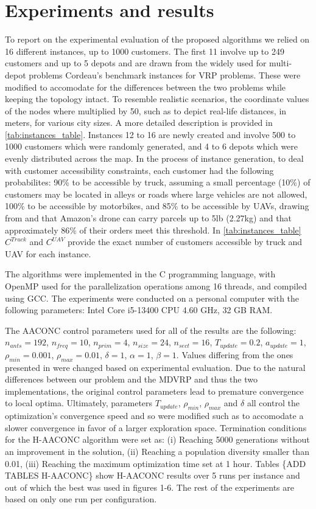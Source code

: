 \documentclass{article}
\begin{document}
	\section{Experiments and results}
	To report on the experimental evaluation of the proposed algorithms we relied on 16 different instances, up to 1000 customers. The first 11 involve up to 249 customers and up to 5 depots and are drawn from the widely used for multi-depot problems Cordeau's \cite{Cordeau1997} benchmark instances for VRP problems. These were modified to accomodate for the differences between the two problems while keeping the topology intact. To resemble realistic scenarios, the coordinate values of the nodes where multiplied by 50, such as to depict real-life distances, in meters, for various city sizes. A more detailed description is provided in \autoref{tab:instances_table}. Instances 12 to 16 are newly created and involve 500 to 1000 customers which were randomly generated, and 4 to 6 depots which were evenly distributed across the map. In the process of instance generation, to deal with customer accessibility constraints, each customer had the following probabilites: 90\% to be accessible by truck, assuming a small percentage (10\%) of customers may be located in alleys or roads where large vehicles are not allowed, 100\% to be accessible by motorbikes, and 85\% to be accessible by UAVs, drawing from \cite{Sacramento2019} and \cite{Allain2013} that Amazon's drone can carry parcels up to 5lb (2.27kg) and that approximately 86\% of their orders meet this threshold. In \autoref{tab:instances_table} $C^{Truck}$ and $C^{UAV}$  provide the exact number of customers accessible by truck and UAV for each instance.
	
	\par
	The algorithms were implemented in the C programming language, with OpenMP used for the parallelization operations among 16 threads, and compiled using GCC. The experiments were conducted on a personal computer with the following parameters: Intel Core i5-13400 CPU 4.60 GHz, 32 GB RAM.
	\par
	The AACONC control parameters used for all of the results are the following: $n_{ants} = 192$, $n_{freq} = 10$, $n_{prim} = 4$, $n_{size} = 24$, $n_{sect} = 16$, $T_{update} = 0.2$, $a_{update} = 1$, $\rho_{min} = 0.001$, $\rho_{max} = 0.01$, $\delta = 1$, $\alpha = 1$, $\beta = 1$. Values differing from the ones presented in \parencite{Stodola2022} were changed based on experimental evaluation.
	Due to the natural differences between our problem and the MDVRP and thus the two implementations, the original control parameters lead to premature convergence to local optima. Ultimately, parameters $T_{update}$, $\rho_{min}$, $\rho_{max}$ and $\delta$ all control the optimization's convergence speed and so were modified such as to accomodate a slower convergence in favor of a larger exploration space. Termination conditions for the H-AACONC algorithm were set as: (i) Reaching 5000 generations without an improvement in the solution, (ii) Reaching a population diversity smaller than 0.01, (iii) Reaching the maximum optimization time set at 1 hour. Tables \{ADD TABLES H-AACONC\} show H-AACONC results over 5 runs per instance and out of which the best was used in figures 1-6. The rest of the experiments are based on only one run per configuration.
\end{document}
